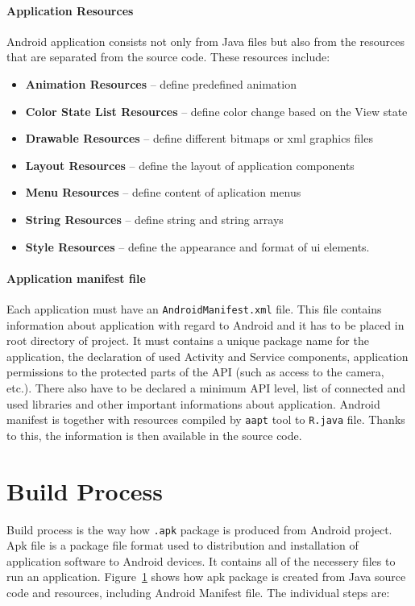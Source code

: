 \paragraph{Application Resources}
Android application consists not only from Java files but also from the resources that are separated from the source code. These resources include:
\begin{itemize}
\item \textbf{Animation Resources} -- define predefined animation
\item \textbf{Color State List Resources} -- define color change based on the View state
\item \textbf{Drawable Resources} -- define different bitmaps or xml graphics files
\item \textbf{Layout Resources} -- define the layout of application components
\item \textbf{Menu Resources} -- define content of aplication menus
\item \textbf{String Resources} -- define string and string arrays
\item \textbf{Style Resources} -- define the appearance and format of ui elements.
\end{itemize}

\paragraph{Application manifest file}
Each application must have an \texttt{AndroidManifest.xml} file. This file contains information about application with regard to Android and it has to be placed in root directory of project. It must contains a unique package name for the application, the declaration of used Activity and Service components, application permissions to the protected parts of the API (such as access to the camera, etc.). There also have to be declared a minimum API level, list of connected and used libraries and other important informations about application. Android manifest is together with resources compiled by \texttt{aapt} tool to \texttt{R.java} file. Thanks to this, the information is then available in the source code.

\section{Build Process}\label{buildProcess}
Build process is the way how \texttt{.apk} package is produced from Android project. Apk file is a package file format
used to distribution and installation of application software to Android devices. It contains all of the necessery files
to run an application. Figure~\ref{buildProcess} shows how apk package is created from Java source code and resources,
including Android Manifest file. The individual steps are:

